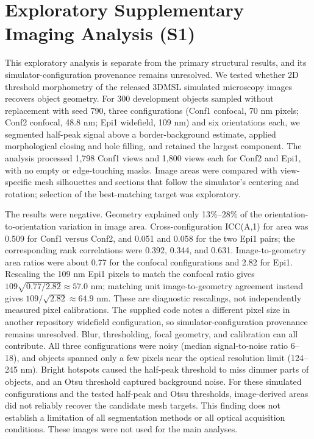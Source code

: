\documentclass[journal]{IEEEtran}
\begin{document}
\section{Exploratory Supplementary Imaging Analysis (S1)}

This exploratory analysis is separate from the primary structural results, and its simulator-configuration provenance remains unresolved. We tested whether 2D threshold morphometry of the released 3DMSL simulated microscopy images recovers object geometry. For 300 development objects sampled without replacement with seed 790, three configurations (Conf1 confocal, 70 nm pixels; Conf2 confocal, 48.8 nm; Epi1 widefield, 109 nm) and six orientations each, we segmented half-peak signal above a border-background estimate, applied morphological closing and hole filling, and retained the largest component. The analysis processed 1,798 Conf1 views and 1,800 views each for Conf2 and Epi1, with no empty or edge-touching masks. Image areas were compared with view-specific mesh silhouettes and sections that follow the simulator's centering and rotation; selection of the best-matching target was exploratory.

The results were negative. Geometry explained only 13\%--28\% of the orientation-to-orientation variation in image area. Cross-configuration ICC(A,1) for area was 0.509 for Conf1 versus Conf2, and 0.051 and 0.058 for the two Epi1 pairs; the corresponding rank correlations were 0.392, 0.344, and 0.631. Image-to-geometry area ratios were about 0.77 for the confocal configurations and 2.82 for Epi1. Rescaling the 109 nm Epi1 pixels to match the confocal ratio gives $109\sqrt{0.77/2.82}\approx57.0$ nm; matching unit image-to-geometry agreement instead gives $109/\sqrt{2.82}\approx64.9$ nm. These are diagnostic rescalings, not independently measured pixel calibrations. The supplied code notes a different pixel size in another repository widefield configuration, so simulator-configuration provenance remains unresolved. Blur, thresholding, focal geometry, and calibration can all contribute. All three configurations were noisy (median signal-to-noise ratio 6--18), and objects spanned only a few pixels near the optical resolution limit (124--245 nm). Bright hotspots caused the half-peak threshold to miss dimmer parts of objects, and an Otsu threshold captured background noise. For these simulated configurations and the tested half-peak and Otsu thresholds, image-derived areas did not reliably recover the candidate mesh targets. This finding does not establish a limitation of all segmentation methods or all optical acquisition conditions. These images were not used for the main analyses.
\end{document}
